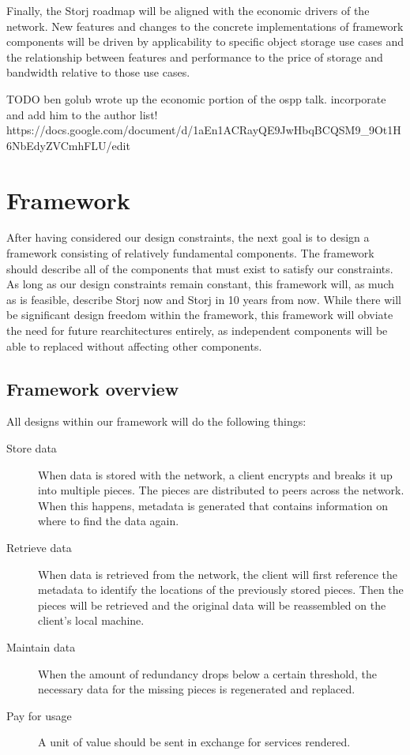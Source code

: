 \documentclass[11pt,fleqn,openany]{book}
\newcommand{\todo}[1]{{\color{red} TODO #1 }}
\begin{document}
Finally, the Storj roadmap will be aligned with the economic drivers of the
network.
New features and changes to the concrete implementations of framework
components will be driven by applicability to specific object storage use cases
and the relationship between features and performance to the price of storage
and bandwidth relative to those use cases.

\todo{ben golub wrote up the economic portion of the ospp talk. incorporate
and add him to the author list!
https://docs.google.com/document/d/1aEn1ACRayQE9JwHbqBCQSM9\_9Ot1H6NbEdyZVCmhFLU/edit
}

\chapter{Framework}\label{chap:framework}

After having considered our design constraints, the next goal is to design
a framework consisting of relatively fundamental components.
The framework should describe
all of the components that must exist to satisfy our constraints.
As long as our design constraints remain constant, this framework will, as
much as is feasible, describe Storj now and Storj in 10 years from now.
While there will be significant design freedom within the framework,
this framework will obviate the need for future rearchitectures entirely, as
independent components will be able to replaced without affecting other
components.

\section{Framework overview}

All designs within our framework will do the following things:

\begin{description}

\item[Store data] When data is stored with the network, a client encrypts
and breaks it up into multiple pieces. The pieces are distributed
to peers across the network. When this happens, metadata is generated that
contains information on where to find the data again.

\item[Retrieve data] When data is retrieved from the network,
the client will first reference the metadata to identify the locations of the
previously stored pieces.
Then the pieces will be retrieved and the original data will be reassembled
on the client's local machine.

\item[Maintain data] When the amount of redundancy drops below a certain
threshold, the necessary data for the missing pieces is regenerated and
replaced.

\item[Pay for usage] A unit of value should be sent in exchange for
services rendered.

\end{description}
\end{document}
